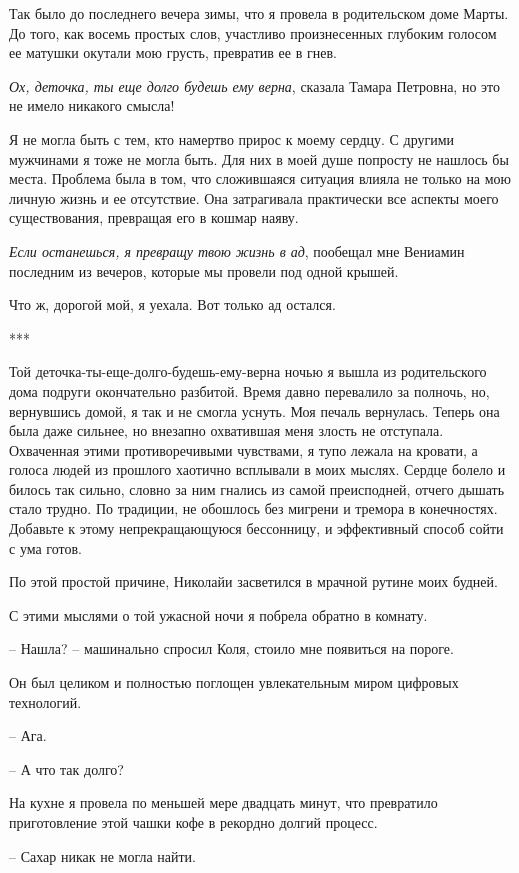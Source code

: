 \documentclass[
]{book}
\begin{document}
Так было до последнего вечера зимы, что я провела в родительском доме Марты. До того, как восемь простых слов, участливо произнесенных глубоким голосом ее матушки окутали мою грусть, превратив ее в гнев.

\emph{Ох, деточка, ты еще долго будешь ему верна}, сказала Тамара Петровна, но это не имело никакого смысла!

Я не могла быть с тем, кто намертво прирос к моему сердцу. С другими мужчинами я тоже не могла быть. Для них в моей душе попросту не нашлось бы места. Проблема была в том, что сложившаяся ситуация влияла не только на мою личную жизнь и ее отсутствие. Она затрагивала практически все аспекты моего существования, превращая его в кошмар наяву.

\emph{Если останешься, я превращу твою жизнь в ад}, пообещал мне Вениамин последним из вечеров, которые мы провели под одной крышей.

Что ж, дорогой мой, я уехала. Вот только ад остался.

***

Той деточка-ты-еще-долго-будешь-ему-верна ночью я вышла из родительского дома подруги окончательно разбитой. Время давно перевалило за полночь, но, вернувшись домой, я так и не смогла уснуть. Моя печаль вернулась. Теперь она была даже сильнее, но внезапно охватившая меня злость не отступала. Охваченная этими противоречивыми чувствами, я тупо лежала на кровати, а голоса людей из прошлого хаотично всплывали в моих мыслях. Сердце болело и билось так сильно, словно за ним гнались из самой преисподней, отчего дышать стало трудно. По традиции, не обошлось без мигрени и тремора в конечностях. Добавьте к этому непрекращающуюся бессонницу, и эффективный способ сойти с ума готов.

По этой простой причине, Николайи засветился в мрачной рутине моих будней.

С этими мыслями о той ужасной ночи я побрела обратно в комнату.

-- Нашла? -- машинально спросил Коля, стоило мне появиться на пороге.

Он был целиком и полностью поглощен увлекательным миром цифровых технологий.

-- Ага.

-- А что так долго?

На кухне я провела по меньшей мере двадцать минут, что превратило приготовление этой чашки кофе в рекордно долгий процесс.

-- Сахар никак не могла найти.
\end{document}
